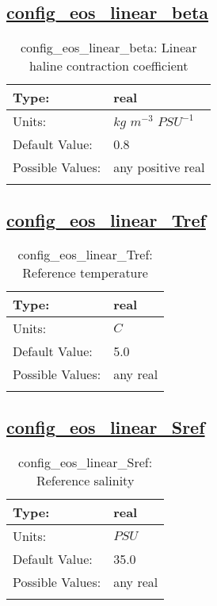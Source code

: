 \subsection[config\_eos\_linear\_beta]{\hyperref[sec:nm_tab_eos_linear]{config\_eos\_linear\_beta}}
\label{subsec:nm_sec_config_eos_linear_beta}
\begin{center}
\begin{longtable}{| p{2.0in} || p{4.0in} |}
    \hline
    Type: & real \\
    \hline
    Units: & $kg$ $m^{-3}$ $PSU^{-1}$ \\
    \hline
    Default Value: & 0.8 \\
    \hline
    Possible Values: & any positive real \\
    \hline
    \caption{config\_eos\_linear\_beta: Linear haline contraction coefficient}
\end{longtable}
\end{center}
\subsection[config\_eos\_linear\_Tref]{\hyperref[sec:nm_tab_eos_linear]{config\_eos\_linear\_Tref}}
\label{subsec:nm_sec_config_eos_linear_Tref}
\begin{center}
\begin{longtable}{| p{2.0in} || p{4.0in} |}
    \hline
    Type: & real \\
    \hline
    Units: & $C$ \\
    \hline
    Default Value: & 5.0 \\
    \hline
    Possible Values: & any real \\
    \hline
    \caption{config\_eos\_linear\_Tref: Reference temperature}
\end{longtable}
\end{center}
\subsection[config\_eos\_linear\_Sref]{\hyperref[sec:nm_tab_eos_linear]{config\_eos\_linear\_Sref}}
\label{subsec:nm_sec_config_eos_linear_Sref}
\begin{center}
\begin{longtable}{| p{2.0in} || p{4.0in} |}
    \hline
    Type: & real \\
    \hline
    Units: & $PSU$ \\
    \hline
    Default Value: & 35.0 \\
    \hline
    Possible Values: & any real \\
    \hline
    \caption{config\_eos\_linear\_Sref: Reference salinity}
\end{longtable}
\end{center}
